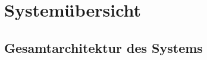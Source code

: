 \chapter{Systemübersicht}
\label{ch:systemübersicht}

\section{Gesamtarchitektur des Systems}
\label{sec:GesamtarchitekturdesSystems}
